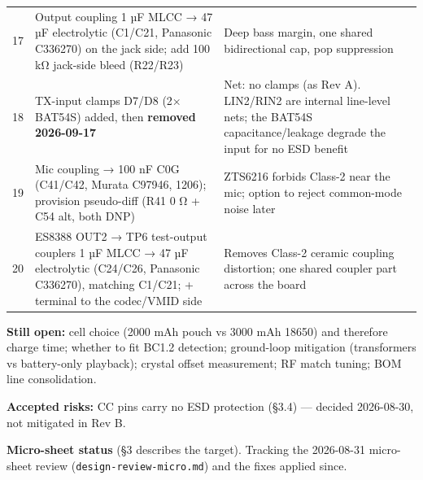 \documentclass[11pt]{article}
\begin{document}
\begin{longtable}{@{}c L{\linewidth-1cm} L{\linewidth-1cm}@{}}
17 & Output coupling 1 µF MLCC → 47 µF electrolytic (C1/C21, Panasonic C336270) on the jack side; add 100 kΩ jack-side bleed (R22/R23) & Deep bass margin, one shared bidirectional cap, pop suppression \\
18 & TX-input clamps D7/D8 (2× BAT54S) added, then \textbf{removed 2026-09-17} & Net: no clamps (as Rev A). LIN2/RIN2 are internal line-level nets; the BAT54S capacitance/leakage degrade the input for no ESD benefit \\
19 & Mic coupling → 100 nF C0G (C41/C42, Murata C97946, 1206); provision pseudo-diff (R41 0 Ω + C54 alt, both DNP) & ZTS6216 forbids Class-2 near the mic; option to reject common-mode noise later \\
20 & ES8388 OUT2 → TP6 test-output couplers 1 µF MLCC → 47 µF electrolytic (C24/C26, Panasonic C336270), matching C1/C21; + terminal to the codec/VMID side & Removes Class-2 ceramic coupling distortion; one shared coupler part across the board \\
\bottomrule
\end{longtable}
\normalsize

\textbf{Still open:} cell choice (2000 mAh pouch vs 3000 mAh 18650) and therefore charge time; whether
to fit BC1.2 detection; ground-loop mitigation (transformers vs battery-only playback); crystal
offset measurement; RF match tuning; BOM line consolidation.

\textbf{Accepted risks:} CC pins carry no ESD protection (§3.4) — decided 2026-08-30, not mitigated
in Rev B.

\textbf{Micro-sheet status} (§3 describes the target). Tracking the 2026-08-31 micro-sheet review
(\texttt{design-review-micro.md}) and the fixes applied since.
\end{document}
